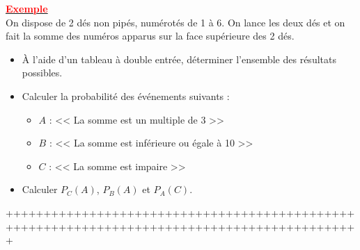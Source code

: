 \documentclass[12pt,a4paper]{article}
\begin{document}
\underline{\textbf{\textcolor{red}{Exemple}}}\\
On dispose de 2 dés non pipés, numérotés de 1 à 6. On lance les deux dés et on fait la somme des numéros apparus sur la face supérieure des 2 dés.

\begin{itemize}
    \item À l'aide d'un tableau à double entrée, déterminer l'ensemble des résultats possibles.
    \item Calculer la probabilité des événements suivants :
    \begin{itemize}
        \item $A$ : << La somme est un multiple de 3 >>
        \item $B$ : << La somme est inférieure ou égale à 10 >>
        \item $C$ : << La somme est impaire >>
    \end{itemize}
    \item Calculer $P_C(A)$, $P_B(A)$ et $P_A(C)$.
\end{itemize}

+++++++++++++++++++++++++++++++++++++++++++++++++++++++++++++++++++++++++++++++++++++++++++++
\end{document}

